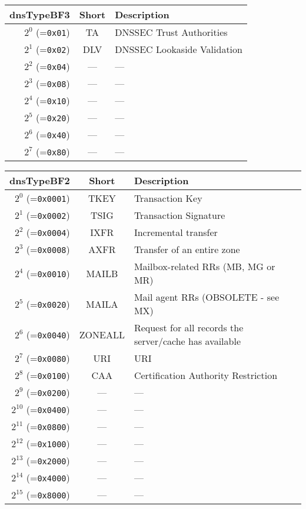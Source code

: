 \documentclass[documentation]{subfiles}
\begin{document}
\begin{longtable}{rcl}
    \toprule
    {\bf dnsTypeBF3} & {\bf Short} & {\bf Description}\\
    \midrule\endhead%
    $2^0$ (={\tt 0x01}) & TA & DNSSEC Trust Authorities \\
    $2^1$ (={\tt 0x02}) & DLV & DNSSEC Lookaside Validation \\
    $2^2$ (={\tt 0x04}) & --- & --- \\
    $2^3$ (={\tt 0x08}) & --- & --- \\
    $2^4$ (={\tt 0x10}) & --- & --- \\
    $2^5$ (={\tt 0x20}) & --- & --- \\
    $2^6$ (={\tt 0x40}) & --- & --- \\
    $2^7$ (={\tt 0x80}) & --- & --- \\
    \bottomrule
\end{longtable}

\begin{longtable}{rcl}
    \toprule
    {\bf dnsTypeBF2} & {\bf Short} & {\bf Description} \\
    \midrule\endhead%
    $2^{0}$  (={\tt 0x0001}) & TKEY & Transaction Key \\
    $2^{1}$  (={\tt 0x0002}) & TSIG & Transaction Signature \\
    $2^{2}$  (={\tt 0x0004}) & IXFR & Incremental transfer \\
    $2^{3}$  (={\tt 0x0008}) & AXFR & Transfer of an entire zone \\
    $2^{4}$  (={\tt 0x0010}) & MAILB & Mailbox-related RRs (MB, MG or MR) \\
    $2^{5}$  (={\tt 0x0020}) & MAILA & Mail agent RRs (OBSOLETE - see MX) \\
    $2^{6}$  (={\tt 0x0040}) & ZONEALL & Request for all records the server/cache has available  \\
    $2^{7}$  (={\tt 0x0080}) & URI & URI \\
    $2^{8}$  (={\tt 0x0100}) & CAA & Certification Authority Restriction \\
    $2^{9}$  (={\tt 0x0200}) & --- & --- \\
    $2^{10}$ (={\tt 0x0400}) & --- & --- \\
    $2^{11}$ (={\tt 0x0800}) & --- & --- \\
    $2^{12}$ (={\tt 0x1000}) & --- & --- \\
    $2^{13}$ (={\tt 0x2000}) & --- & --- \\
    $2^{14}$ (={\tt 0x4000}) & --- & --- \\
    $2^{15}$ (={\tt 0x8000}) & --- & --- \\
    \bottomrule
\end{longtable}
\end{document}
